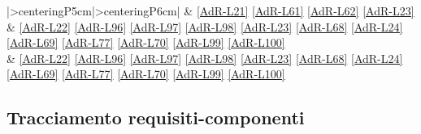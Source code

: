 \begin{longtable}{|>{centering}P{5cm}|>{centering}P{6cm}|}
	\hline {} & \ref{AdR-L21} \linebreak \ref{AdR-L61} \linebreak \ref{AdR-L62} \linebreak \ref{AdR-L23} \\
	\hline {} & \ref{AdR-L22} \linebreak \ref{AdR-L96} \linebreak \ref{AdR-L97} \linebreak \ref{AdR-L98} \linebreak \ref{AdR-L23} \linebreak \ref{AdR-L68} \linebreak \ref{AdR-L24} \linebreak \ref{AdR-L69} \linebreak \ref{AdR-L77} \linebreak \ref{AdR-L70} \linebreak \ref{AdR-L99} \linebreak \ref{AdR-L100} \\
	\hline {} & \ref{AdR-L22} \linebreak \ref{AdR-L96} \linebreak \ref{AdR-L97} \linebreak \ref{AdR-L98} \linebreak \ref{AdR-L23} \linebreak \ref{AdR-L68} \linebreak \ref{AdR-L24} \linebreak \ref{AdR-L69} \linebreak \ref{AdR-L77} \linebreak \ref{AdR-L70} \linebreak \ref{AdR-L99} \linebreak \ref{AdR-L100} \\
	
	\hline
	\caption{Tracciamento componenti-requisiti}
\end{longtable}

\subsection{Tracciamento requisiti-componenti}

